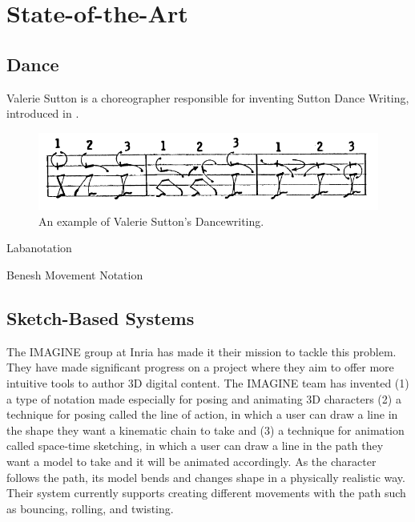 \chapter{State-of-the-Art}\label{chap:sota}



\section{Dance}
Valerie Sutton is a choreographer responsible for inventing Sutton Dance Writing, introduced in \citep{sutton1979sutton}. 

\begin{figure}[!h]
\centering
\includegraphics[scale=0.4]{img/sutton}
\caption{An example of Valerie Sutton's Dancewriting.}
\end{figure}

Labanotation

Benesh Movement Notation

\section{Sketch-Based Systems}
The IMAGINE group at Inria has made it their mission to tackle this problem. They have made significant progress on a project where they aim to offer more intuitive tools to author 3D digital content. The IMAGINE team has invented (1) a type of notation made especially for posing and animating 3D characters (2) a technique for posing called the line of action, in which a user can draw a line in the shape they want a kinematic chain to take and (3) a technique for animation called space-time sketching, in which a user can draw a line in the path they want a model to take and it will be animated accordingly. As the character follows the path, its model bends and changes shape in a physically realistic way. Their system currently supports creating different movements with the path such as bouncing, rolling, and twisting.

